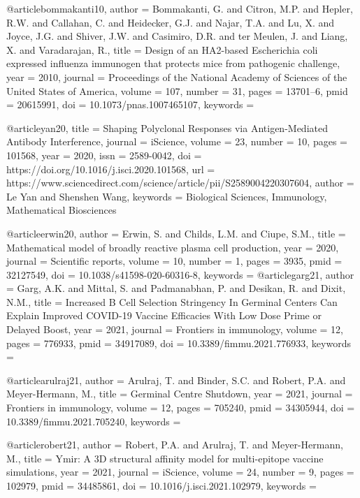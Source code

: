 @article{bommakanti10,
  author = {Bommakanti, G. and Citron, M.P. and Hepler, R.W. and Callahan, C. and Heidecker, G.J. and Najar, T.A. and Lu, X. and Joyce, J.G. and Shiver, J.W. and Casimiro, D.R. and ter Meulen, J. and Liang, X. and Varadarajan, R.},
  title = {Design of an HA2-based Escherichia coli expressed influenza immunogen that protects mice from pathogenic challenge},
  year = 2010,
  journal = {Proceedings of the National Academy of Sciences of the United States of America},
  volume = 107,
  number = 31,
  pages = {13701--6},
  pmid = 20615991,
  doi = {10.1073/pnas.1007465107},
  keywords = {}
}

@article{yan20,
 title = {Shaping Polyclonal Responses via Antigen-Mediated Antibody Interference},
 journal = {iScience},
 volume = {23},
 number = {10},
 pages = {101568},
 year = {2020},
 issn = {2589-0042},
 doi = {https://doi.org/10.1016/j.isci.2020.101568},
 url = {https://www.sciencedirect.com/science/article/pii/S2589004220307604},
 author = {Le Yan and Shenshen Wang},
 keywords = {Biological Sciences, Immunology, Mathematical Biosciences}
}

@article{erwin20,
  author = {Erwin, S. and Childs, L.M. and Ciupe, S.M.},
  title = {Mathematical model of broadly reactive plasma cell production},
  year = 2020,
  journal = {Scientific reports},
  volume = 10,
  number = 1,
  pages = {3935},
  pmid = 32127549,
  doi = {10.1038/s41598-020-60316-8},
  keywords = {}
}
@article{garg21,
  author = {Garg, A.K. and Mittal, S. and Padmanabhan, P. and Desikan, R. and Dixit, N.M.},
  title = {Increased B Cell Selection Stringency In Germinal Centers Can Explain Improved COVID-19 Vaccine Efficacies With Low Dose Prime or Delayed Boost},
  year = 2021,
  journal = {Frontiers in immunology},
  volume = 12,
  pages = {776933},
  pmid = 34917089,
  doi = {10.3389/fimmu.2021.776933},
  keywords = {}
}

@article{arulraj21,
  author = {Arulraj, T. and Binder, S.C. and Robert, P.A. and Meyer-Hermann, M.},
  title = {Germinal Centre Shutdown},
  year = 2021,
  journal = {Frontiers in immunology},
  volume = 12,
  pages = {705240},
  pmid = 34305944,
  doi = {10.3389/fimmu.2021.705240},
  keywords = {}
}

@article{robert21,
  author = {Robert, P.A. and Arulraj, T. and Meyer-Hermann, M.},
  title = {Ymir: A 3D structural affinity model for multi-epitope vaccine simulations},
  year = 2021,
  journal = {iScience},
  volume = 24,
  number = 9,
  pages = {102979},
  pmid = 34485861,
  doi = {10.1016/j.isci.2021.102979},
  keywords = {}
}

